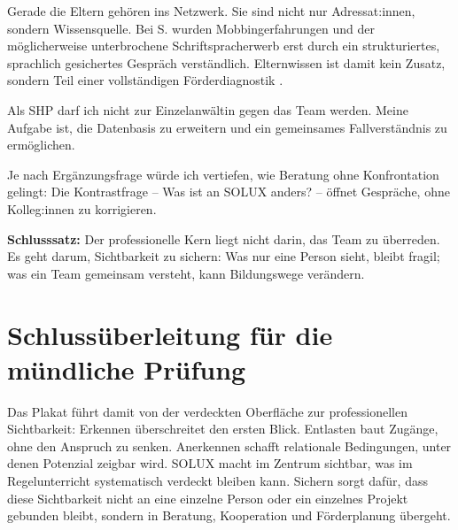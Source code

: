 \documentclass[ngerman, a4paper]{article}
\begin{document}
Gerade die Eltern gehören ins Netzwerk. Sie sind nicht nur Adressat:innen,
sondern Wissensquelle. Bei S. wurden Mobbingerfahrungen und der möglicherweise
unterbrochene Schriftspracherwerb erst durch ein strukturiertes, sprachlich
gesichertes Gespräch verständlich. Elternwissen ist damit kein Zusatz, sondern
Teil einer vollständigen Förderdiagnostik
\parencite{kosoroklabhart2021voneltern}.

Als SHP darf ich nicht zur Einzelanwältin gegen das Team werden. Meine Aufgabe
ist, die Datenbasis zu erweitern und ein gemeinsames Fallverständnis zu
ermöglichen.

Je nach Ergänzungsfrage würde ich vertiefen, wie Beratung ohne Konfrontation
gelingt: Die Kontrastfrage -- Was ist an SOLUX anders? -- öffnet Gespräche,
ohne Kolleg:innen zu korrigieren.

\textbf{Schlusssatz:} Der professionelle Kern liegt nicht darin, das Team zu
überreden. Es geht darum, Sichtbarkeit zu sichern: Was nur eine Person sieht,
bleibt fragil; was ein Team gemeinsam versteht, kann Bildungswege verändern.

\newpage

\section*{Schlussüberleitung für die mündliche Prüfung}

Das Plakat führt damit von der verdeckten Oberfläche zur professionellen
Sichtbarkeit: Erkennen überschreitet den ersten Blick. Entlasten baut Zugänge,
ohne den Anspruch zu senken. Anerkennen schafft relationale Bedingungen, unter
denen Potenzial zeigbar wird. SOLUX macht im Zentrum sichtbar, was im
Regelunterricht systematisch verdeckt bleiben kann. Sichern sorgt dafür, dass
diese Sichtbarkeit nicht an eine einzelne Person oder ein einzelnes Projekt
gebunden bleibt, sondern in Beratung, Kooperation und Förderplanung übergeht.

\newpage

\printbibliography[title={Literaturverzeichnis}, heading=bibintoc]
\end{document}
